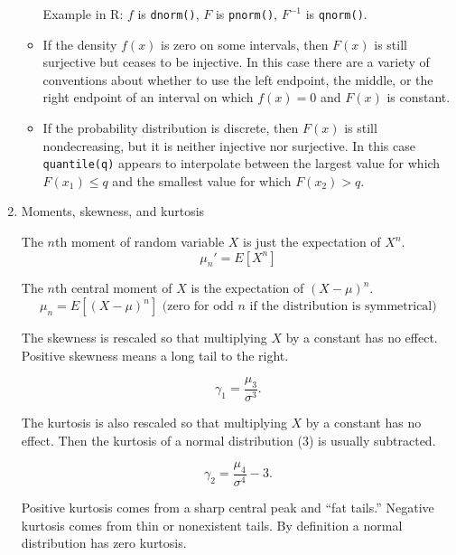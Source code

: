 \documentclass[12pt]{article}
\begin{document}
\begin{enumerate}
\begin{itemize}
Example in R: $f$ is \verb!dnorm()!, $F$ is \verb!pnorm()!, $F^{-1}$ is \verb!qnorm()!.

\vspace {100pt}

\item If the density $f(x)$ is zero on some intervals, then $F(x)$ is still surjective but ceases to be injective. In this case there are a variety of conventions about whether to use the left endpoint, the middle, or the right endpoint of an interval on which $f(x)  = 0$ and $F(x)$ is constant.

\vspace {100pt}

\item If the probability distribution is discrete, then $F(x)$ is still nondecreasing, but it is neither injective nor surjective. In this case \verb!quantile(q)! appears to interpolate between the largest value for which $F(x_1) \leq q$ and the smallest value for which $F(x_2) > q.$ 




\end{itemize}

\pagebreak

\item Moments, skewness, and kurtosis

The $n$th moment of random variable $X$ is just the expectation of $X^n.$
$$\mu_n ' = E[X^n]$$

The $n$th central moment of $X$ is the expectation of $(X-\mu)^n.$
$$\mu_n  = E[(X-\mu)^n] \text{ (zero for odd $n$ if the distribution is symmetrical)}$$

The skewness is rescaled so that multiplying $X$ by a constant has no effect. Positive skewness means a long tail to the right.

$$\gamma_1 = \frac{\mu_3}{\sigma^3}.$$

\vspace{100pt}

The kurtosis is also rescaled so that multiplying $X$ by a constant has no effect. Then the kurtosis of a normal distribution (3) is usually subtracted.

$$\gamma_2 = \frac{\mu_4}{\sigma^4}-3.$$

  Positive kurtosis comes from a sharp central peak and ``fat tails.'' Negative kurtosis comes from thin or nonexistent tails. By definition a normal distribution has zero kurtosis.






\end{enumerate}
\end{document}

